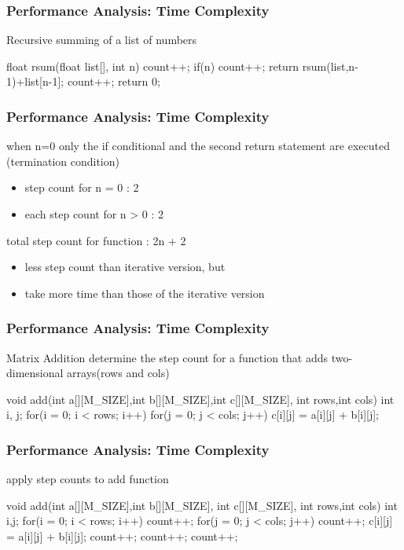 \documentclass[newPxFont,sthlmFooter,nooffset]{beamer}
\begin{document}
\begin{frame}[t,fragile]
  \frametitle{Performance Analysis: Time Complexity}
Recursive summing of a list of numbers
\begin{codedef}
float rsum(float list[], int n) {
   count++;
   if(n) {
      count++;
      return rsum(list,n-1)+list[n-1]; 
   }
   count++;
   return 0; 
}
\end{codedef}
\end{frame}


\begin{frame}[t]
  \frametitle{Performance Analysis: Time Complexity}
when n=0 only the if conditional and the second return statement are executed (termination condition)

\begin{itemize}
\item step count for n = 0 : 2
\item each step count for n > 0 : 2
\end{itemize}

total step count for function : 2n + 2
\begin{itemize}
\item  less step count than iterative version, but
\item take more time than those of the iterative version
\end{itemize}

\end{frame}


\begin{frame}[t, fragile]
  \frametitle{Performance Analysis: Time Complexity}
Matrix Addition determine the step count for a function that adds
two-dimensional arrays(rows and cols)
\begin{codedef}
void add(int a[][M_SIZE],int b[][M_SIZE],int c[][M_SIZE],
         int rows,int cols) {
   int i, j;
   for(i = 0; i < rows; i++)
      for(j = 0; j < cols; j++) 
         c[i][j] = a[i][j] + b[i][j];
}
\end{codedef}
\end{frame}


\begin{frame}[t, fragile]
  \frametitle{Performance Analysis: Time Complexity}
apply step counts to add function
\begin{codedef}
void add(int a[][M_SIZE],int b[][M_SIZE], int c[][M_SIZE],
         int rows,int cols) {
   int i,j;
   for(i = 0; i < rows; i++) {
      count++;
      for(j = 0; j < cols; j++) {
         count++;
         c[i][j] = a[i][j] + b[i][j];
         count++;
      }
      count++; 
   }
   count++; 
}
\end{codedef}
\end{frame}
\end{document}
